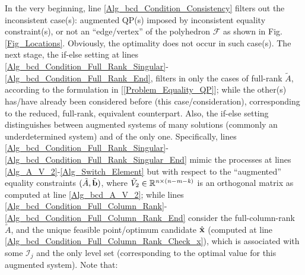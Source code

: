 \documentclass[9pt,twocolumn,twoside,lineno]{pnas-new-1}
\newcommand{\bfb}{{\bf b}}
\newcommand{\bfx}{{\bf x}}
\newcommand{\real}{\mathbb{R}}
\newcommand{\calF}{{\mathcal F}}
\newcommand{\calI}{{\mathcal I}}
\newcommand{\itk}{{\it k}}
\newcommand{\itm}{{\it m}}
\newcommand{\itn}{{\it n}}
\theoremstyle{remark}
\begin{document}
In the very beginning, line \ref{Alg_bcd_Condition_Consistency} filters out the inconsistent case(s): augmented QP(s) imposed by inconsistent equality constraint(s), or not an ``edge/vertex'' of the polyhedron $\calF$ as shown in Fig. \ref{Fig_Locations}. Obviously, the optimality does not occur in such case(s). The next stage, the if-else setting at lines \ref{Alg_bcd_Condition_Full_Rank_Singular}-\ref{Alg_bcd_Condition_Full_Rank_End}, filters in only the cases of full-rank $\tilde A$, according to the formulation in [\ref{Problem_Equality_QP}]; while the other(s) has/have already been considered before (this case/consideration), corresponding to the reduced, full-rank, equivalent counterpart. Also, the if-else setting distinguishes between augmented systems of many solutions (commonly an underdetermined system) and of the only one. Specifically, lines \ref{Alg_bcd_Condition_Full_Rank_Singular}-\ref{Alg_bcd_Condition_Full_Rank_Singular_End} mimic the processes at lines \ref{Alg_A_V_2}-\ref{Alg_Switch_Element} but with respect to the ``augmented'' equality constraints $(\tilde A,\tilde\bfb)$, where $\tilde V_2\in\real^{\itn\times(\itn-\itm-\itk)}$ is an orthogonal matrix as computed at line \ref{Alg_bcd_A_V_2}; while lines \ref{Alg_bcd_Condition_Full_Column_Rank}-\ref{Alg_bcd_Condition_Full_Column_Rank_End} consider the full-column-rank $\tilde A$, and the unique feasible point/optimum candidate $\hat\bfx$ (computed at line \ref{Alg_bcd_Condition_Full_Column_Rank_Check_x}), which is associated with some $\calI_j$ and the only level set (corresponding to the optimal value for this augmented system). Note that:
\end{document}

